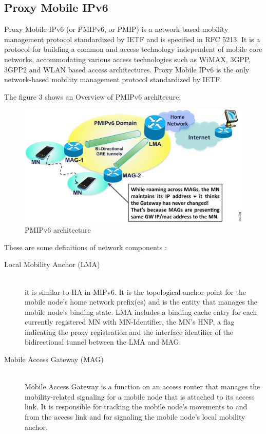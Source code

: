 \documentclass{article}
\begin{document}
\subsection{Proxy Mobile IPv6}

Proxy Mobile IPv6 (or PMIPv6, or PMIP) is a network-based mobility
management protocol standardized by IETF and is specified in RFC
5213. It is a protocol for building a common and access technology
independent of mobile core networks, accommodating various access
technologies such as WiMAX, 3GPP, 3GPP2 and WLAN based access
architectures. Proxy Mobile IPv6 is the only network-based mobility
management protocol standardized by IETF.

The figure 3 shows an Overview of PMIPv6 architecure: 

\begin{figure}[h!]
  \centering
    \includegraphics[scale=0.5]{reportPictures/figure3.jpg}
  \caption{PMIPv6 architecture}
\end{figure}


These are some definitions of network components : 

\begin{description}
  \item[Local Mobility Anchor (LMA)] \hfill \\ 
it is similar to HA in MIPv6.  It is the topological anchor point for
the mobile node's home network prefix(es) and is the entity that
manages the mobile node's binding state. LMA includes a binding cache
entry for each currently registered MN with MN-Identifier, the MN's
HNP, a flag indicating the proxy registration and the interface
identifier of the bidirectional tunnel between the LMA and MAG.
  \item[Mobile Access Gateway (MAG)] \hfill \\ 
Mobile Access Gateway is a function on an access router that manages
the mobility-related signaling for a mobile node that is attached to
its access link.  It is responsible for tracking the mobile node's
movements to and from the access link and for signaling the mobile
node's local mobility anchor.
\end{description}
\end{document}
